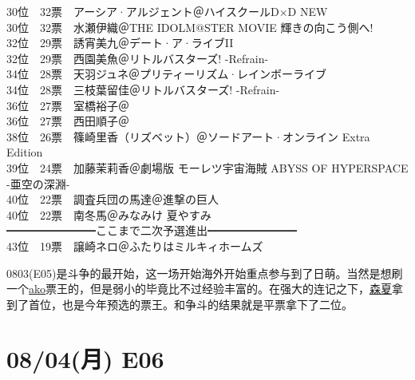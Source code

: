 {    30位　32票　アーシア·アルジェント＠ハイスクールD×D NEW\\
    30位　32票　水瀬伊織＠THE IDOLM@STER MOVIE 輝きの向こう側へ!\\
    32位　29票　誘宵美九＠デート·ア·ライブII\\
    32位　29票　西園美魚＠リトルバスターズ! -Refrain-\\
    34位　28票　天羽ジュネ＠プリティーリズム·レインボーライブ\\
    34位　28票　三枝葉留佳＠リトルバスターズ! -Refrain-\\
    36位　27票　室橋裕子＠\Saki\\
    36位　27票　西田順子＠\Saki\\
    38位　26票　篠崎里香（リズベット）＠ソードアート·オンライン Extra Edition\\
    39位　24票　加藤茉莉香＠劇場版 モーレツ宇宙海賊 ABYSS OF HYPERSPACE -亜空の深淵-\\
    40位　22票　調査兵団の馬達＠進撃の巨人\\
    40位　22票　南冬馬＠みなみけ 夏やすみ\\
    ━━━━━━━━ここまで二次予選進出━━━━━━━━\\
    43位　19票　譲崎ネロ＠ふたりはミルキィホームズ
}

0803(E05)是斗争的最开始，这一场开始海外开始重点参与到了日萌。当然是想刷一个\uline{ako}票王的，但是弱小的毕竟比不过经验丰富的。在强大的连记之下，\uline{森夏}拿到了首位，也是今年预选的票王。和争斗的结果就是平票拿下了二位。

\section{08/04(月) E06}

